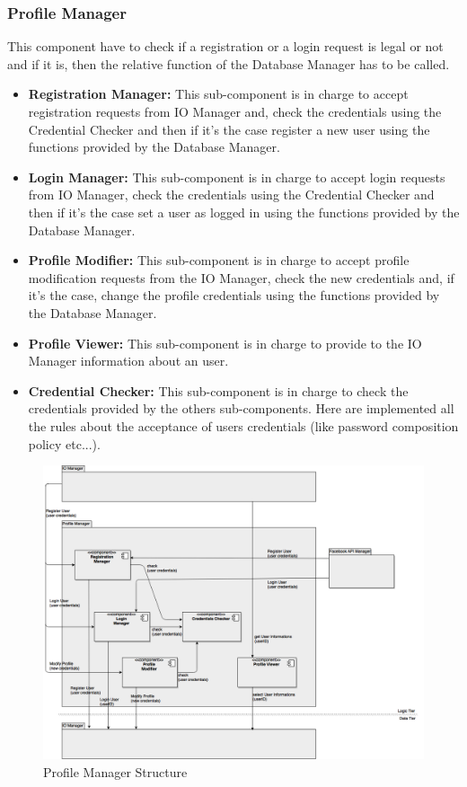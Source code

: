 \documentclass[../../../../../../../dd.tex]{subfiles}
\begin{document}
	\subsubsection{Profile Manager}
		This component have to check if a registration or a login request is legal or not and if it is, then the relative function of the Database Manager has to be called.
		\begin{itemize}
			\item \textbf{Registration Manager:} This sub-component is in charge to accept registration requests from IO Manager and, check the credentials using the Credential Checker and then if it's the case register a new user using the functions provided by the Database Manager.

			\item \textbf{Login Manager:} This sub-component is in charge to accept login requests from IO Manager, check the credentials using the Credential Checker and then if it's the case set a user as logged in using the functions provided by the Database Manager.

			\item \textbf{Profile Modifier:} This sub-component is in charge to accept profile modification requests from the IO Manager, check the new credentials and, if it's the case, change the profile credentials using the functions provided by the Database Manager.

			\item \textbf{Profile Viewer:} This sub-component is in charge to provide to the IO Manager information about an user.

			\item \textbf{Credential Checker:} This sub-component is in charge to check the credentials provided by the others sub-components. Here are implemented all the rules about the acceptance of users credentials (like password composition policy etc...).
		\end{itemize}

		\begin{figure}[H]
				\centering
				\includegraphics[width=\textwidth, scale=0.5]{../images/ProfileManager.png}
			\caption{Profile Manager Structure}\label{fig:ProfileManager}
		\end{figure}
		
\end{document}

